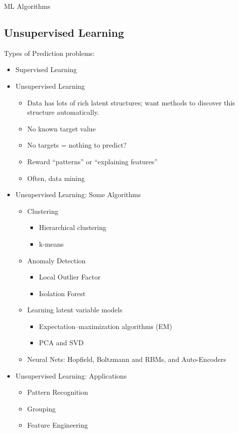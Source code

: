 \documentclass{beamer}
\begin{document}
\begin{frame}[allowframebreaks]{ML Algorithms}
\subsection{Unsupervised Learning}
Types of Prediction problems:
\begin{itemize}
\item Supervised Learning
\item Unsupervised Learning
\begin{itemize}
    \item Data has lots of rich latent structures; want methods to discover this structure automatically.
    \item No known target value
    \item No targets = nothing to predict?
    \item Reward “patterns” or “explaining features”
    \item Often, data mining
\end{itemize}
\end{itemize}

\framebreak
\begin{itemize}
\item Unsupervised Learning: Some Algorithms
\begin{itemize}
    \item Clustering
    \begin{itemize}
        \item Hierarchical clustering
        \item k-means
    \end{itemize}
    \item Anomaly Detection
    \begin{itemize}
        \item Local Outlier Factor
        \item Isolation Forest
    \end{itemize}
    \item Learning latent variable models
    \begin{itemize}
        \item Expectation–maximization algorithms (EM)
        \item PCA and SVD
    \end{itemize}
    \item Neural Nets: Hopfield, Boltzmann and RBMs, and Auto-Encoders
\end{itemize}
\item Unsupervised Learning: Applications
    \begin{itemize}
        \item Pattern Recognition
        \item Grouping
        \item Feature Engineering
    \end{itemize}
\end{itemize}


\end{frame}
\end{document}
